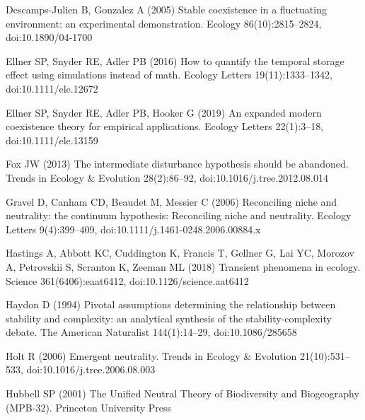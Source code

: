 \documentclass[a4paper,12pt]{article}
\begin{document}
\begin{thebibliography}{68}
Descamps-Julien B, Gonzalez A (2005) Stable coexistence in a fluctuating
  environment: an experimental demonstration. Ecology 86(10):2815--2824,
  doi:{10.1890/04-1700}

Ellner SP, Snyder RE, Adler PB (2016) How to quantify the temporal storage
  effect using simulations instead of math. Ecology Letters 19(11):1333--1342,
  doi:{10.1111/ele.12672}

Ellner SP, Snyder RE, Adler PB, Hooker G (2019) An expanded modern coexistence
  theory for empirical applications. Ecology Letters 22(1):3--18,
  doi:{10.1111/ele.13159}

Fox JW (2013) The intermediate disturbance hypothesis should be abandoned.
  Trends in Ecology \& Evolution 28(2):86--92, doi:{10.1016/j.tree.2012.08.014}

Gravel D, Canham CD, Beaudet M, Messier C (2006) Reconciling niche and
  neutrality: the continuum hypothesis: {Reconciling} niche and neutrality.
  Ecology Letters 9(4):399--409, doi:{10.1111/j.1461-0248.2006.00884.x}

Hastings A, Abbott KC, Cuddington K, Francis T, Gellner G, Lai YC, Morozov A,
  Petrovskii S, Scranton K, Zeeman ML (2018) Transient phenomena in ecology.
  Science 361(6406):eaat6412, doi:{10.1126/science.aat6412}

Haydon D (1994) Pivotal assumptions determining the relationship between
  stability and complexity: an analytical synthesis of the stability-complexity
  debate. The American Naturalist 144(1):14--29, doi:{10.1086/285658}

Holt R (2006) Emergent neutrality. Trends in Ecology \& Evolution
  21(10):531--533, doi:{10.1016/j.tree.2006.08.003}

Hubbell SP (2001) The {Unified} {Neutral} {Theory} of {Biodiversity} and
  {Biogeography} ({MPB}-32). Princeton University Press


\end{thebibliography}
\end{document}
